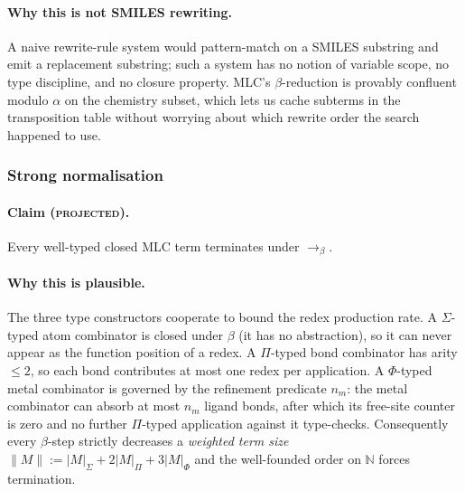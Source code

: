 \paragraph{Why this is not SMILES rewriting.}
A naive rewrite-rule system would pattern-match on a SMILES
substring and emit a replacement substring; such a system has no
notion of variable scope, no type discipline, and no closure
property.
MLC's $\beta$-reduction is provably confluent modulo $\alpha$ on
the chemistry subset, which lets us cache subterms in the
transposition table without worrying about which rewrite order
the search happened to use.

\subsubsection{Strong normalisation}
\label{sec:mlc-strong-norm}

\paragraph{Claim (\textsc{projected}).}
Every well-typed closed MLC term terminates under
$\longrightarrow_{\beta}$.

\paragraph{Why this is plausible.}
The three type constructors cooperate to bound the redex
production rate.
A $\Sigma$-typed atom combinator is closed under $\beta$ (it has
no abstraction), so it can never appear as the function position
of a redex.
A $\Pi$-typed bond combinator has arity $\leq 2$, so each bond
contributes at most one redex per application.
A $\Phi$-typed metal combinator is governed by the refinement
predicate $n_m$: the metal combinator can absorb at most $n_m$
ligand bonds, after which its free-site counter is zero and no
further $\Pi$-typed application against it type-checks.
Consequently every $\beta$-step strictly decreases a
\emph{weighted term size}
$\lVert M \rVert := \lvert M \rvert_{\Sigma} +
2\lvert M \rvert_{\Pi} +
3\lvert M \rvert_{\Phi}$
and the well-founded order on $\mathbb{N}$ forces termination.

